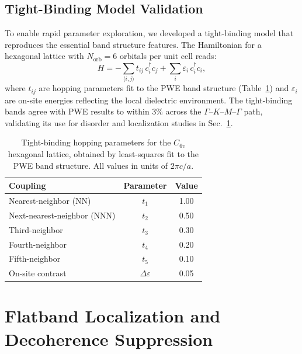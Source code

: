 \documentclass[10pt,letterpaper]{article}
\begin{document}
\subsection{Tight-Binding Model Validation}

To enable rapid parameter exploration, we developed a tight-binding model that reproduces the essential band structure features. The Hamiltonian for a hexagonal lattice with $N_\mathrm{orb} = 6$ orbitals per unit cell reads:
\begin{equation}
H = -\sum_{\langle i,j \rangle} t_{ij}\,c_i^\dagger c_j + \sum_i \varepsilon_i\,c_i^\dagger c_i,
\label{eq:tightbinding}
\end{equation}
where $t_{ij}$ are hopping parameters fit to the PWE band structure (Table~\ref{tab:hopping}) and $\varepsilon_i$ are on-site energies reflecting the local dielectric environment. The tight-binding bands agree with PWE results to within 3\% across the $\Gamma$--$K$--$M$--$\Gamma$ path, validating its use for disorder and localization studies in Sec.~\ref{sec:localization}.

\begin{table}[h]
\centering
\caption{Tight-binding hopping parameters for the $C_{6v}$ hexagonal lattice, obtained by least-squares fit to the PWE band structure. All values in units of $2\pi c/a$.}
\label{tab:hopping}
\begin{tabular}{lcc}
\toprule
\textbf{Coupling} & \textbf{Parameter} & \textbf{Value} \\
\midrule
Nearest-neighbor (NN) & $t_1$ & 1.00 \\
Next-nearest-neighbor (NNN) & $t_2$ & 0.50 \\
Third-neighbor & $t_3$ & 0.30 \\
Fourth-neighbor & $t_4$ & 0.20 \\
Fifth-neighbor & $t_5$ & 0.10 \\
On-site contrast & $\Delta\varepsilon$ & 0.05 \\
\bottomrule
\end{tabular}
\end{table}


\section{Flatband Localization and Decoherence Suppression}
\label{sec:localization}
\end{document}
